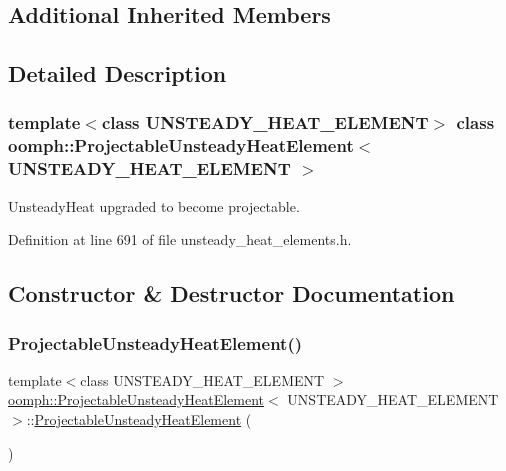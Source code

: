 \subsection*{Additional Inherited Members}


\subsection{Detailed Description}
\subsubsection*{template$<$class U\+N\+S\+T\+E\+A\+D\+Y\+\_\+\+H\+E\+A\+T\+\_\+\+E\+L\+E\+M\+E\+NT$>$\newline
class oomph\+::\+Projectable\+Unsteady\+Heat\+Element$<$ U\+N\+S\+T\+E\+A\+D\+Y\+\_\+\+H\+E\+A\+T\+\_\+\+E\+L\+E\+M\+E\+N\+T $>$}

Unsteady\+Heat upgraded to become projectable. 

Definition at line 691 of file unsteady\+\_\+heat\+\_\+elements.\+h.



\subsection{Constructor \& Destructor Documentation}
\mbox{\label{classoomph_1_1ProjectableUnsteadyHeatElement_a0c06505ffcefcceaddf84905b5a8c1ce}} 
\subsubsection{\texorpdfstring{Projectable\+Unsteady\+Heat\+Element()}{ProjectableUnsteadyHeatElement()}}
{\footnotesize\ttfamily template$<$class U\+N\+S\+T\+E\+A\+D\+Y\+\_\+\+H\+E\+A\+T\+\_\+\+E\+L\+E\+M\+E\+NT $>$ \\
\hyperlink{classoomph_1_1ProjectableUnsteadyHeatElement}{oomph\+::\+Projectable\+Unsteady\+Heat\+Element}$<$ U\+N\+S\+T\+E\+A\+D\+Y\+\_\+\+H\+E\+A\+T\+\_\+\+E\+L\+E\+M\+E\+NT $>$\+::\hyperlink{classoomph_1_1ProjectableUnsteadyHeatElement}{Projectable\+Unsteady\+Heat\+Element} (\begin{DoxyParamCaption}{ }\end{DoxyParamCaption})\hspace{0.3cm}{\ttfamily [inline]}}



